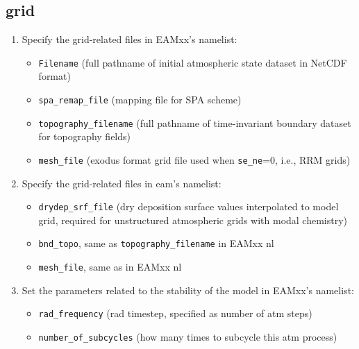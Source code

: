 \documentclass[journal abbreviation, manuscript]{copernicus}
\begin{document}
\subsection{grid}
\begin{enumerate}
\item Specify the grid-related files in EAMxx's namelist:
    \begin{itemize}
    \item \verb|Filename| (full pathname of initial atmospheric state dataset in NetCDF format)
    \item \verb|spa_remap_file| (mapping file for SPA scheme) 
    \item \verb|topography_filename| (full pathname of time-invariant boundary dataset for topography fields)
    \item \verb|mesh_file| (exodus format grid file used when \verb|se_ne|=0, i.e., RRM grids)
    \end{itemize}

\item Specify the grid-related files in eam's namelist:
    \begin{itemize}
    \item \verb|drydep_srf_file| (dry deposition surface values interpolated to model grid, required for unstructured atmospheric grids with modal chemistry)
    \item \verb|bnd_topo|, same as \verb|topography_filename| in EAMxx nl
    \item \verb|mesh_file|, same as in EAMxx nl
    \end{itemize}
    
\item Set the parameters related to the stability of the model in EAMxx's namelist:
    \begin{itemize}
    \item \verb|rad_frequency| (rad timestep, specified as number of atm steps)
    \item \verb|number_of_subcycles| (how many times to subcycle this atm process)
    \end{itemize}


\end{enumerate}
\end{document}
